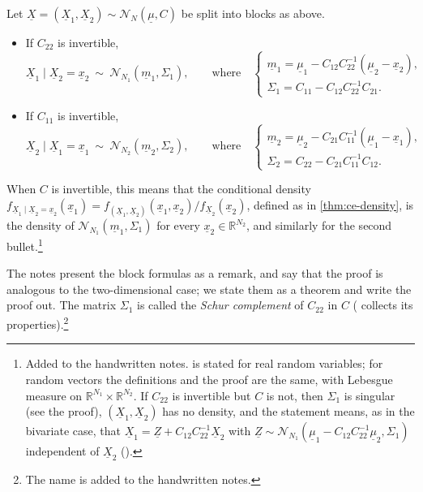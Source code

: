 \begin{theorem}\label{thm:gc-block}
Let $\underline X=(\underline X_1,\underline X_2)\sim\mathcal N_N(\underline\mu,C)$ be split into blocks as above.
\begin{itemize}
  \item If $C_{22}$ is invertible,
    \[
      \underline X_1\mid\underline X_2=\underline x_2\ \sim\ \mathcal N_{N_1}(\underline m_1,\Sigma_1),\qquad\text{where}\quad
      \begin{cases}
        \underline m_1=\underline\mu_1-C_{12}C_{22}^{-1}(\underline\mu_2-\underline x_2),\\
        \Sigma_1=C_{11}-C_{12}C_{22}^{-1}C_{21}.
      \end{cases}
    \]
  \item If $C_{11}$ is invertible,
    \[
      \underline X_2\mid\underline X_1=\underline x_1\ \sim\ \mathcal N_{N_2}(\underline m_2,\Sigma_2),\qquad\text{where}\quad
      \begin{cases}
        \underline m_2=\underline\mu_2-C_{21}C_{11}^{-1}(\underline\mu_1-\underline x_1),\\
        \Sigma_2=C_{22}-C_{21}C_{11}^{-1}C_{12}.
      \end{cases}
    \]
\end{itemize}
When $C$ is invertible, this means that the conditional density
$f_{\underline X_1\mid\underline X_2=\underline x_2}(\underline x_1)=f_{(\underline X_1,\underline X_2)}(\underline x_1,\underline x_2)/f_{\underline X_2}(\underline x_2)$, defined as in \cref{thm:ce-density},
is the density of $\mathcal N_{N_1}(\underline m_1,\Sigma_1)$ for every $\underline x_2\in\mathbb R^{N_2}$, and similarly for
the second bullet.\footnote{Added to the handwritten notes.  is stated for real
random variables; for random vectors the definitions and the proof are the same, with Lebesgue measure
on $\mathbb R^{N_1}\times\mathbb R^{N_2}$. If $C_{22}$ is invertible but $C$ is not, then $\Sigma_1$ is
singular (see the proof), $(\underline X_1,\underline X_2)$ has no density, and the statement means, as in the bivariate
case, that $\underline X_1=\underline Z+C_{12}C_{22}^{-1}\underline X_2$ with $\underline Z\sim\mathcal N_{N_1}(\underline\mu_1-C_{12}C_{22}^{-1}\underline\mu_2,\Sigma_1)$
independent of $\underline X_2$ ().}
\end{theorem}

The notes present the block formulas as a remark, and say that the proof is analogous to the
two-dimensional case; we state them as a theorem and write the proof out. The matrix $\Sigma_1$ is
called the \emph{Schur complement} of $C_{22}$ in $C$ ( collects its
properties).\footnote{The name is added to the handwritten notes.}

